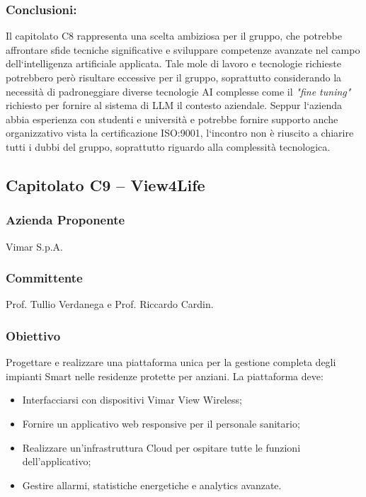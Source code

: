 \documentclass[a4paper,12pt]{article}
\begin{document}
\subsubsection*{Conclusioni:}
Il capitolato C8 rappresenta una scelta ambiziosa per il gruppo, che potrebbe affrontare sfide tecniche significative e sviluppare competenze avanzate nel campo dell`intelligenza artificiale applicata.
Tale mole di lavoro e tecnologie richieste potrebbero però risultare eccessive per il gruppo, soprattutto considerando la necessità di padroneggiare diverse tecnologie AI complesse come il \textit{"fine tuning"} richiesto per fornire al sistema di LLM il contesto aziendale.
Seppur l`azienda abbia esperienza con studenti e università e potrebbe fornire supporto anche organizzativo vista la certificazione ISO:9001, l`incontro non è riuscito a chiarire tutti i dubbi del gruppo, soprattutto riguardo alla complessità tecnologica.
\vspace{2.0cm}

\subsection{Capitolato C9 – View4Life}

\subsubsection*{Azienda Proponente}
Vimar S.p.A.

\subsubsection*{Committente}
Prof. Tullio Verdanega e Prof. Riccardo Cardin.

\subsubsection*{Obiettivo}
Progettare e realizzare una piattaforma unica per la gestione completa degli impianti Smart nelle residenze protette per anziani. La piattaforma deve:
\begin{itemize}
    \item Interfacciarsi con dispositivi Vimar View Wireless;
    \item Fornire un applicativo web responsive per il personale sanitario;
    \item Realizzare un'infrastruttura Cloud per ospitare tutte le funzioni
          dell'applicativo;
    \item Gestire allarmi, statistiche energetiche e analytics avanzate.
\end{itemize}
\end{document}
